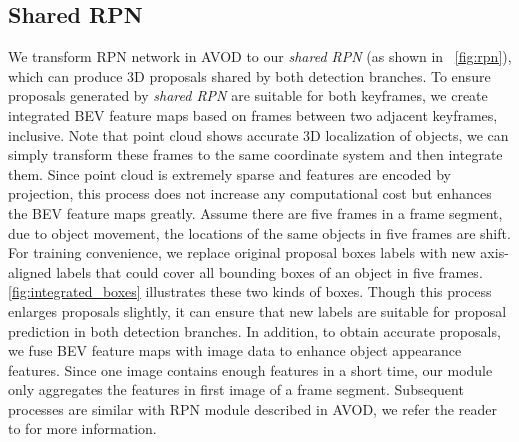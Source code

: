 \documentclass[letterpaper, 10pt, conference]{ieeeconf}  %
\begin{document}
\subsection{Shared RPN}

We transform RPN network in AVOD \cite{ku2018joint} to our \textit{shared RPN} (as shown in \figurename \, \ref{fig:rpn}), which can produce 3D proposals shared by both detection branches. To ensure proposals generated by \textit{shared RPN} are suitable for both keyframes, we create integrated BEV feature maps based on frames between two adjacent keyframes, inclusive. Note that point cloud shows accurate 3D localization of objects, we can simply transform these frames to the same coordinate system and then integrate them. Since point cloud is extremely sparse and features are encoded by projection, this process does not increase any computational cost but enhances the BEV feature maps greatly. Assume there are five frames in a frame segment, due to object movement, the locations of the same objects in five frames are shift. For training convenience, we replace original proposal boxes labels with new axis-aligned labels that could cover all bounding boxes of an object in five frames. \figurename \, \ref{fig:integrated_boxes} illustrates these two kinds of boxes. Though this process enlarges proposals slightly, it can ensure that new labels are suitable for proposal prediction in both detection branches. In addition, to obtain accurate proposals, we fuse BEV feature maps with image data to enhance object appearance features. Since one image contains enough features in a short time, our module only aggregates the features in first image of a frame segment. Subsequent processes are similar with RPN module described in AVOD, we refer the reader to \cite{ku2018joint} for more information.

\end{document}
